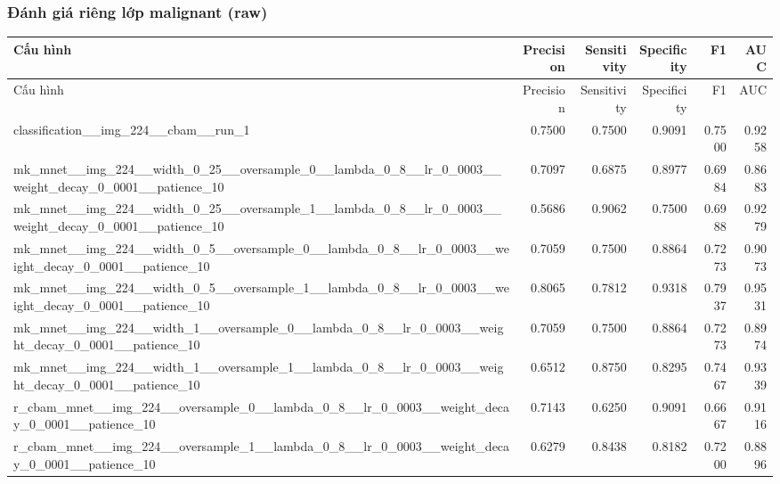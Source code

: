 \subsubsection*{Đánh giá riêng lớp malignant (raw)}
\scriptsize
\begin{longtable}{p{5.2cm}rrrrr}
\toprule
Cấu hình & Precision & Sensitivity & Specificity & F1 & AUC \\
\midrule
\endfirsthead
\toprule
Cấu hình & Precision & Sensitivity & Specificity & F1 & AUC \\
\midrule
\endhead
classification\_\_img\_224\_\_cbam\_\_run\_1 & 0.7500 & 0.7500 & 0.9091 & 0.7500 & 0.9258 \\
mk\_mnet\_\_img\_224\_\_width\_0\_25\_\_oversample\_0\_\_lambda\_0\_8\_\_lr\_0\_0003\_\_weight\_decay\_0\_0001\_\_patience\_10 & 0.7097 & 0.6875 & 0.8977 & 0.6984 & 0.8683 \\
mk\_mnet\_\_img\_224\_\_width\_0\_25\_\_oversample\_1\_\_lambda\_0\_8\_\_lr\_0\_0003\_\_weight\_decay\_0\_0001\_\_patience\_10 & 0.5686 & 0.9062 & 0.7500 & 0.6988 & 0.9279 \\
mk\_mnet\_\_img\_224\_\_width\_0\_5\_\_oversample\_0\_\_lambda\_0\_8\_\_lr\_0\_0003\_\_weight\_decay\_0\_0001\_\_patience\_10 & 0.7059 & 0.7500 & 0.8864 & 0.7273 & 0.9073 \\
mk\_mnet\_\_img\_224\_\_width\_0\_5\_\_oversample\_1\_\_lambda\_0\_8\_\_lr\_0\_0003\_\_weight\_decay\_0\_0001\_\_patience\_10 & 0.8065 & 0.7812 & 0.9318 & 0.7937 & 0.9531 \\
mk\_mnet\_\_img\_224\_\_width\_1\_\_oversample\_0\_\_lambda\_0\_8\_\_lr\_0\_0003\_\_weight\_decay\_0\_0001\_\_patience\_10 & 0.7059 & 0.7500 & 0.8864 & 0.7273 & 0.8974 \\
mk\_mnet\_\_img\_224\_\_width\_1\_\_oversample\_1\_\_lambda\_0\_8\_\_lr\_0\_0003\_\_weight\_decay\_0\_0001\_\_patience\_10 & 0.6512 & 0.8750 & 0.8295 & 0.7467 & 0.9339 \\
r\_cbam\_mnet\_\_img\_224\_\_oversample\_0\_\_lambda\_0\_8\_\_lr\_0\_0003\_\_weight\_decay\_0\_0001\_\_patience\_10 & 0.7143 & 0.6250 & 0.9091 & 0.6667 & 0.9116 \\
r\_cbam\_mnet\_\_img\_224\_\_oversample\_1\_\_lambda\_0\_8\_\_lr\_0\_0003\_\_weight\_decay\_0\_0001\_\_patience\_10 & 0.6279 & 0.8438 & 0.8182 & 0.7200 & 0.8896 \\
\bottomrule
\end{longtable}
\normalsize
